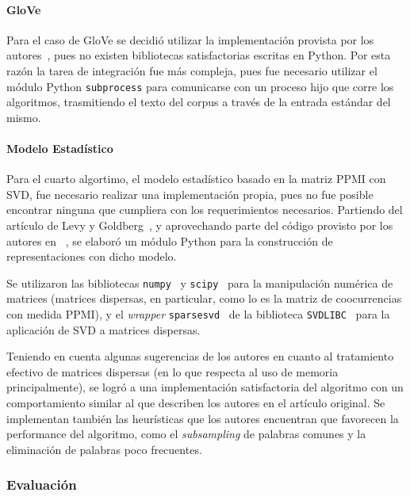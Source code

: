 \paragraph{GloVe}

Para el caso de GloVe se decidió utilizar la implementación provista por los autores~\cite{Pennington2014},
pues no existen bibliotecas satisfactorias escritas en Python. Por esta razón la tarea de integración fue
más compleja, pues fue necesario utilizar el módulo Python \texttt{subprocess} para comunicarse con
un proceso hijo que corre los algoritmos, trasmitiendo el texto del corpus a través de la entrada
estándar del mismo.


\paragraph{Modelo Estadístico}

Para el cuarto algortimo, el modelo estadístico basado en la matriz PPMI con SVD, fue necesario
realizar una implementación propia, pues no fue posible encontrar ninguna que cumpliera con los
requerimientos necesarios. Partiendo del artículo de Levy y Goldberg~\cite{Levy2015}, y aprovechando
parte del código provisto por los autores en ~\cite{LevyHyperwords}, se elaboró un módulo Python para
la construcción de representaciones con dicho modelo.

Se utilizaron las bibliotecas \texttt{numpy}~\cite{NumPy} y \texttt{scipy}~\cite{SciPy} para la
manipulación numérica de matrices (matrices dispersas, en particular, como lo es la matriz de coocurrencias
con medida PPMI), y el \textit{wrapper} \texttt{sparsesvd}~\cite{sparsesvd} de la biblioteca
\texttt{SVDLIBC}~\cite{SVDLIBC} para la aplicación de SVD a matrices dispersas.

Teniendo en cuenta algunas sugerencias de los autores en cuanto al tratamiento efectivo de matrices
dispersas (en lo que respecta al uso de memoria principalmente), se logró a una implementación
satisfactoria del algoritmo con un comportamiento similar al que describen los autores en el
artículo original. Se implementan también las heurísticas que los autores encuentran que favorecen
la performance del algoritmo, como el \textit{subsampling} de palabras comunes y la eliminación de
palabras poco frecuentes.


\subsubsection{Evaluación}

